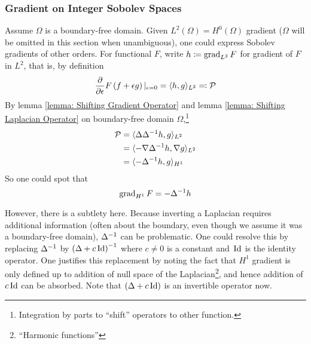 \documentclass[../dissertation.tex]{subfiles}
\begin{document}
\subsubsection{Gradient on Integer Sobolev Spaces}
\label{sct: Gradient on Integer Sobolev Spaces}
Assume $\Omega$ is a boundary-free domain.
Given $L^2(\Omega) = H^0(\Omega)$ gradient ($\Omega$ will be omitted in this section when unambiguous), one could express Sobolev gradients of other orders.
For functional $F$, write $h \coloneqq \operatorname{grad}_{L^2} F$ for gradient of $F$ in $L^2$, that is, by definition
\begin{equation}
    \frac{\partial}{\partial \epsilon} F \left( f + \epsilon g \right)|_{\epsilon = 0} = \langle h, g \rangle_{L^2} \eqqcolon \mathcal{P}
    \label{equ: L2 Gradient Explicit Form}
\end{equation}
By lemma \ref{lemma: Shifting Gradient Operator} and lemma \ref{lemma: Shifting Laplacian Operator} on boundary-free domain $\Omega$,\footnote{Integration by parts to ``shift'' operators to other function.}
\begin{align*}
    \mathcal{P} &= \langle \Delta \Delta^{-1} h, g \rangle_{L^2} \\
    &= \langle -\nabla \Delta^{-1} h, \nabla g \rangle_{L^2} \\
    &= \langle -\Delta^{-1} h, g \rangle_{H^1}
\end{align*}
So one could spot that
\begin{equation}
    \operatorname{grad}_{H^1} F = -\Delta^{-1} h
    \label{equ: H1 Gradient}
\end{equation}
\begin{remark}
However, there is a subtlety here.
Because inverting a Laplacian requires additional information
(often about the boundary, even though we assume it was a boundary-free domain),
$\Delta^{-1}$ can be problematic.
One could resolve this by replacing $\Delta^{-1}$ by $\left(\Delta + c \, \text{Id}\right)^{-1}$
where $c\neq 0$ is a constant and $\, \text{Id}$ is the identity operator.
One justifies this replacement by noting the fact that $H^1$ gradient is only defined up to
addition of null space of the Laplacian\footnote{``Harmonic functions''}, and hence addition of $c \, \text{Id}$ can be absorbed.
Note that $\left(\Delta + c \, \text{Id}\right)$ is an invertible operator now.
\end{remark}
\end{document}
